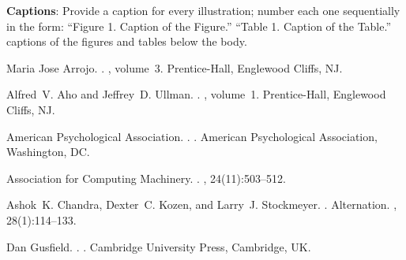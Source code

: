 \documentclass[11pt]{article}
\begin{document}
	{\bf Captions}: Provide a caption for every illustration; number each one
	sequentially in the form:  ``Figure 1. Caption of the Figure.'' ``Table 1.
	Caption of the Table.''  captions of the figures and
	tables below the body.
	
	\begin{thebibliography}{}
		
		Maria Jose Arrojo.
		.
		, volume~3.
		\newblock Prentice-{Hall}, Englewood Cliffs, NJ.
		
		Alfred~V. Aho and Jeffrey~D. Ullman.
		.
		, volume~1.
		\newblock Prentice-{Hall}, Englewood Cliffs, NJ.
		
		{American Psychological Association}.
		.
		.
		\newblock American Psychological Association, Washington, DC.
		
		{Association for Computing Machinery}.
		.
		, 24(11):503--512.
		
		Ashok~K. Chandra, Dexter~C. Kozen, and Larry~J. Stockmeyer.
		.
		\newblock Alternation.
		,
		28(1):114--133.
		
		Dan Gusfield.
		.
		.
		\newblock Cambridge University Press, Cambridge, UK.
		
	\end{thebibliography}
	
\end{document}
